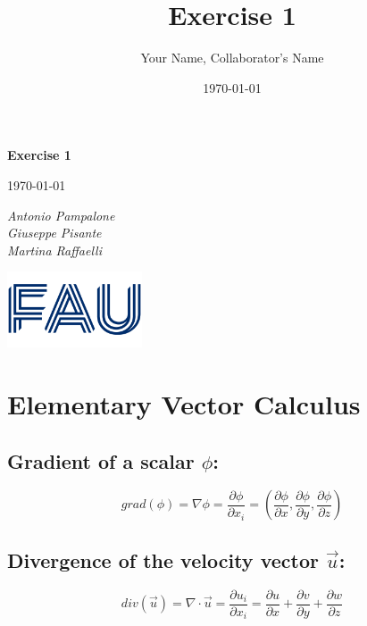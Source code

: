 \documentclass{article}
\title{Exercise 1}
\author{Your Name, Collaborator's Name}
\date{\today}
\begin{document}
\begin{titlepage}
    \centering
    \vspace*{1in}
    
    {\Huge\bfseries Exercise 1\par}
    \vspace{1.5cm}
    {\Large \today\par}
    \vspace{1.5cm}
    {\Large\itshape Antonio Pampalone\\ Giuseppe Pisante\\ Martina Raffaelli\par}
    
    \vfill
    \includegraphics[width=0.3\textwidth]{FAU-Logo.png}\par\vspace{1cm} %
   
\end{titlepage}

\newpage
\small

\section{Elementary Vector Calculus}
 
\subsection{Gradient of a scalar $\phi$:}
    \begin{equation}
        grad(\phi) = \nabla \phi = \frac{\partial \phi}{\partial x_i} = \left( \frac{\partial \phi}{\partial x}, \frac{\partial \phi}{\partial y}, \frac{\partial \phi}{\partial z} \right)
    \end{equation}
\subsection{Divergence of the velocity vector $\vec{u}$:}
    \begin{equation}
        div(\vec{u}) = \nabla \cdot \vec{u} = \frac{\partial u_i}{\partial x_i} = \frac{\partial u}{\partial x} + \frac{\partial v}{\partial y} + \frac{\partial w}{\partial z}
    \end{equation}
\end{document}
